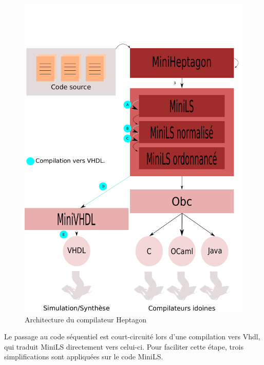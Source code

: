 \documentclass[a4paper]{article}
\newcommand{\LANG}{{\sc Heptagon}}
\newcommand{\minils}{{\sc MiniLS}}
\newcommand{\vhdl}{{\sc Vhdl}}
\begin{document}

\begin{figure}[t]
  \centering
  \includegraphics[scale=0.5]{archi}
  \caption{Architecture du compilateur \LANG}
  \label{fig:archi}
\end{figure}

Le passage au code s\'equentiel est court-circuit\'e lors d'une compilation vers
\vhdl, qui traduit \minils{} directement vers celui-ci. Pour faciliter cette \'etape,
trois simplifications sont appliqu\'ees sur le code \minils.
\end{document}
